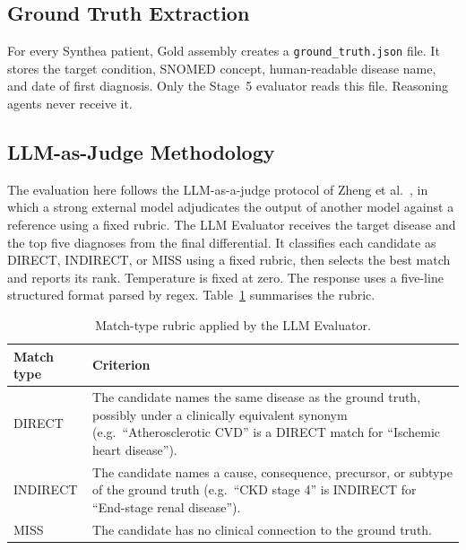 \subsection{Ground Truth Extraction}
For every Synthea patient, Gold assembly creates a \texttt{ground\_truth.json}
file. It stores the target condition, SNOMED concept, human-readable disease
name, and date of first diagnosis. Only the Stage~5 evaluator reads this file.
Reasoning agents never receive it.

\subsection{LLM-as-Judge Methodology}
The evaluation here follows the LLM-as-a-judge protocol of Zheng et
al.~\cite{Zheng2023JudgeLLM}, in which a strong external model
adjudicates the output of another model against a reference using a
fixed rubric. The LLM Evaluator receives the target disease and the
top five diagnoses from
the final differential. It classifies each candidate as DIRECT, INDIRECT, or
MISS using a fixed rubric, then selects the best match and reports its
rank. Temperature is fixed at zero. The response uses a five-line structured
format parsed by regex. Table~\ref{tab:match_types} summarises the rubric.

\begin{table}[!htbp]
\centering
\caption{Match-type rubric applied by the LLM Evaluator.}
\label{tab:match_types}
\small
\begin{tabular}{@{}p{22mm}p{95mm}@{}}
\toprule
\textbf{Match type} & \textbf{Criterion} \\
\midrule
DIRECT   & The candidate names the same disease as the ground truth, possibly
           under a clinically equivalent synonym (e.g.\ ``Atherosclerotic CVD''
           is a DIRECT match for ``Ischemic heart disease''). \\
INDIRECT & The candidate names a cause, consequence, precursor, or subtype of
           the ground truth (e.g.\ ``CKD stage 4'' is INDIRECT for
           ``End-stage renal disease''). \\
MISS     & The candidate has no clinical connection to the ground truth. \\
\bottomrule
\end{tabular}
\end{table}

